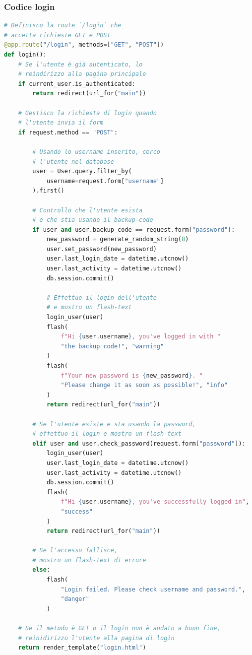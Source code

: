 \documentclass[12pt]{report}
\begin{document}
\subsubsection{Codice login}
\begin{lstlisting}[language=Python]
# Definisco la route `/login` che
# accetta richieste GET e POST
@app.route("/login", methods=["GET", "POST"])
def login():
    # Se l'utente è già autenticato, lo
    # reindirizzo alla pagina principale
    if current_user.is_authenticated:
        return redirect(url_for("main"))

    # Gestisco la richiesta di login quando
    # l'utente invia il form
    if request.method == "POST":

        # Usando lo username inserito, cerco
        # l'utente nel database
        user = User.query.filter_by(
            username=request.form["username"]
        ).first()

        # Controllo che l'utente esista
        # e che stia usando il backup-code
        if user and user.backup_code == request.form["password"]:
            new_password = generate_random_string(8)
            user.set_password(new_password)
            user.last_login_date = datetime.utcnow()
            user.last_activity = datetime.utcnow()
            db.session.commit()

            # Effettuo il login dell'utente
            # e mostro un flash-text
            login_user(user)
            flash(
                f"Hi {user.username}, you've logged in with "
                "the backup code!", "warning"
            )
            flash(
                f"Your new password is {new_password}. "
                "Please change it as soon as possible!", "info"
            )
            return redirect(url_for("main"))

        # Se l'utente esiste e sta usando la password,
        # effettuo il login e mostro un flash-text
        elif user and user.check_password(request.form["password"]):
            login_user(user)
            user.last_login_date = datetime.utcnow()
            user.last_activity = datetime.utcnow()
            db.session.commit()
            flash(
                f"Hi {user.username}, you've successfully logged in",
                "success"
            )
            return redirect(url_for("main"))

        # Se l'accesso fallisce,
        # mostro un flash-text di errore
        else:
            flash(
                "Login failed. Please check username and password.",
                "danger"
            )

    # Se il metodo è GET o il login non è andato a buon fine,
    # reinidirizzo l'utente alla pagina di login
    return render_template("login.html")
\end{lstlisting}
\end{document}
